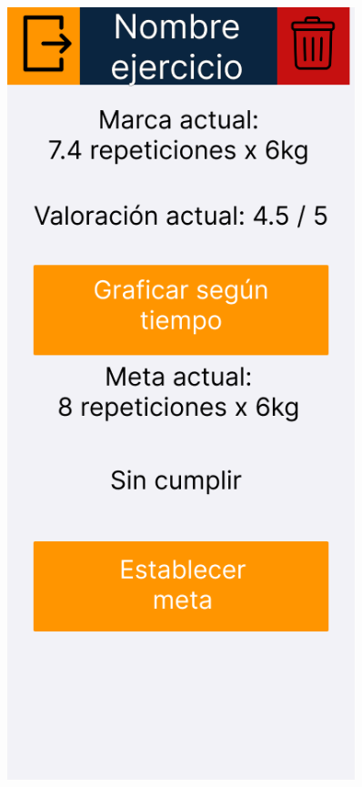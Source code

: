 \newpage

\begin{figure}[H]
   \centering
   \begin{minipage}{0.45\textwidth}
      \centering
      \includegraphics[width=0.9\textwidth]{fotos/Frame 42.png}

\end{minipage}
\end{figure}
